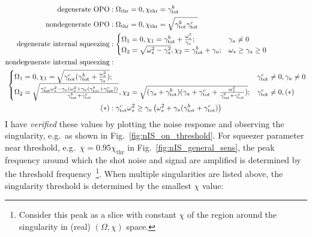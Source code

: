\begin{align}\label{eq:singularity_threshold}
\text{degenerate OPO}&: \Omega_\text{thr}=0, \chi_\text{thr}=\gamma^b_\mathrm{tot}\\
\text{nondegenerate OPO}&: \Omega_\text{thr}=0, \chi_\text{thr}=\sqrt{\gamma^b_\mathrm{tot}\gamma^c_\text{tot}}\\
\text{degenerate internal squeezing}&:\begin{cases}
\Omega_1=0, \chi_1=\gamma^b_\mathrm{tot}+\frac{\omega_s^2}{\gamma_a};&\gamma_a\neq0\\
\Omega_2=\sqrt{\omega_s^2-\gamma_a^2}, \chi_2=\gamma^b_\mathrm{tot}+\gamma_a;&\omega_s\geq\gamma_a\geq0
\end{cases}\\
\text{nondegenerate internal squeezing}&:\nonumber\\&\hspace{-5cm}\begin{cases}
\Omega_1=0, \chi_1=\sqrt{\gamma^c_\text{tot}(\gamma^b_\mathrm{tot}+\frac{\omega_s^2}{\gamma_a})};&\gamma^c_\text{tot}\neq0,\gamma_a\neq0\\
\Omega_2=\sqrt{\frac{\gamma^c_\text{tot}\omega_s^2-\gamma_a(\omega_s^2+\gamma_a(\gamma^b_\mathrm{tot}+\gamma^c_\text{tot}))}{\gamma^b_\mathrm{tot}+\gamma^c_\text{tot}}}, \chi_2=\sqrt{(\gamma_a+\gamma^b_\mathrm{tot})(\gamma_a+\gamma^c_\text{tot}+\frac{\omega_s^2}{\gamma^b_\mathrm{tot}+\gamma^c_\text{tot}})};&\gamma^c_\text{tot}\neq0,(*)
\end{cases}\nonumber\\
(*)&:\gamma^c_\text{tot}\omega_s^2\geq\gamma_a\left(\omega_s^2+\gamma_a(\gamma^b_\mathrm{tot}+\gamma^c_\text{tot})\right)
\end{align}
\endgroup
I have \emph{verified} these values by plotting the noise response and observing the singularity, e.g.\ as shown in Fig.~\ref{fig:nIS_on_threshold}. For squeezer parameter near threshold, e.g.\ $\chi=0.95\chi_\text{thr}$ in Fig.~\ref{fig:nIS_general_sens}, the peak frequency around which the shot noise and signal are amplified is determined by the threshold frequency~\footnote{Consider this peak as a slice with constant $\chi$ of the region around the singularity in (real) $(\Omega,\chi)$ space.}. When multiple singularities are listed above, the singularity threshold is determined by the smallest $\chi$ value:
